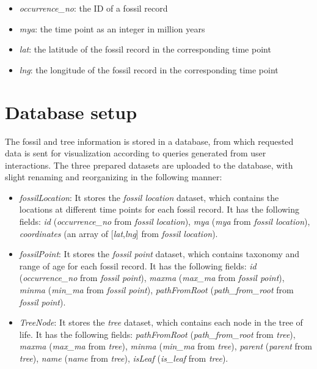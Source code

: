 \documentclass[11pt, a4paper,oneside,chapterprefix=false]{scrbook}
\begin{document}
\begin{itemize}
	\item \textit{occurrence\_no}: the ID of a fossil record
	\item \textit{mya}: the time point as an integer in million years
	\item \textit{lat}: the latitude of the fossil record in the corresponding time point
	\item \textit{lng}: the longitude of the fossil record in the corresponding time point
\end{itemize}

\section{Database setup} \label{sec:tec_database_setup}
The fossil and tree information is stored in a database, from which requested data is sent for visualization according to queries generated from user interactions. The three prepared datasets are uploaded to the database, with slight renaming and reorganizing in the following manner:

\begin{itemize}
	\item \textit{fossilLocation}: It stores the \textit{fossil location} dataset, which contains the locations at different time points for each fossil record. It has the following fields: \textit{id} (\textit{occurrence\_no} from \textit{fossil location}), \textit{mya} (\textit{mya} from \textit{fossil location}), \textit{coordinates} (an array of [\textit{lat},\textit{lng}] from \textit{fossil location}).
	\item \textit{fossilPoint}: It stores the \textit{fossil point} dataset, which contains taxonomy and range of age for each fossil record. It has the following fields: \textit{id} (\textit{occurrence\_no} from \textit{fossil point}), \textit{maxma} (\textit{max\_ma} from \textit{fossil point}), \textit{minma} (\textit{min\_ma} from \textit{fossil point}), \textit{pathFromRoot} (\textit{path\_from\_root} from \textit{fossil point}).
	\item \textit{TreeNode}: It stores the \textit{tree} dataset, which contains each node in the tree of life. It has the following fields: \textit{pathFromRoot} (\textit{path\_from\_root} from \textit{tree}), \textit{maxma} (\textit{max\_ma} from \textit{tree}), \textit{minma} (\textit{min\_ma} from \textit{tree}), \textit{parent} (\textit{parent} from \textit{tree}), \textit{name} (\textit{name} from \textit{tree}), \textit{isLeaf} (\textit{is\_leaf} from \textit{tree}).
\end{itemize}
\end{document}
